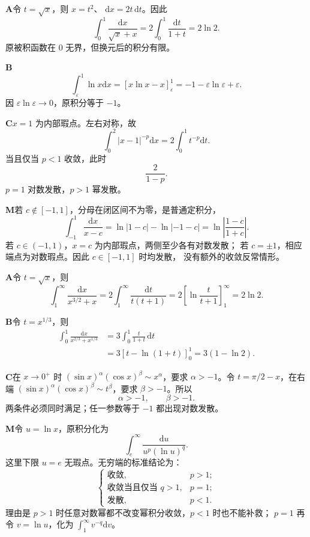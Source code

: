 \begin{solutionBox}
\textbf{A}\quad 令 \(t=\sqrt x\)，则 \(x=t^2\)、
\(\mathrm dx=2t\,\mathrm dt\)。因此
\[
\int_0^1\frac{\mathrm dx}{\sqrt x+x}
=2\int_0^1\frac{\mathrm dt}{1+t}
=2\ln2.
\]
原被积函数在 \(0\) 无界，但换元后的积分有限。
\end{solutionBox}
\begin{solutionBox}
\textbf{B}\quad
\[
\int_\varepsilon^1\ln x\mathrm dx
=[x\ln x-x]_\varepsilon^1
=-1-\varepsilon\ln\varepsilon+\varepsilon.
\]
因 \(\varepsilon\ln\varepsilon\to0\)，原积分等于 \(-1\)。
\end{solutionBox}
\begin{solutionBox}
\textbf{C}\quad \(x=1\) 为内部瑕点。左右对称，故
\[
\int_0^2|x-1|^{-p}\mathrm dx
=2\int_0^1t^{-p}\mathrm dt.
\]
当且仅当 \(p<1\) 收敛，此时
\[
\boxed{\frac2{1-p}}.
\]
\(p=1\) 对数发散，\(p>1\) 幂发散。
\end{solutionBox}
\begin{solutionBox}
\textbf{M}\quad 若 \(c\notin[-1,1]\)，分母在闭区间不为零，是普通定积分，
\[
\int_{-1}^{1}\frac{\mathrm dx}{x-c}
=\ln|1-c|-\ln|-1-c|
=\ln\left|\frac{1-c}{1+c}\right|.
\]
若 \(c\in(-1,1)\)，\(x=c\) 为内部瑕点，两侧至少各有对数发散；
若 \(c=\pm1\)，相应端点为对数瑕点。因此 \(c\in[-1,1]\) 时均发散，
没有额外的收敛反常情形。
\end{solutionBox}

\begin{solutionBox}
\textbf{A}\quad 令 \(t=\sqrt x\)，则
\[
\int_1^\infty\frac{\mathrm dx}{x^{3/2}+x}
=2\int_1^\infty\frac{\mathrm dt}{t(t+1)}
=2\left[\ln\frac{t}{t+1}\right]_1^\infty
=2\ln2.
\]
\end{solutionBox}
\begin{solutionBox}
\textbf{B}\quad 令 \(t=x^{1/3}\)，则
\[
\begin{aligned}
\int_0^1\frac{\mathrm dx}{x^{2/3}+x^{1/3}}
&=3\int_0^1\frac{t}{1+t}\,\mathrm dt\\
&=3\left[t-\ln(1+t)\right]_0^1
=3(1-\ln2).
\end{aligned}
\]
\end{solutionBox}
\begin{solutionBox}
\textbf{C}\quad 在 \(x\to0^+\) 时
\((\sin x)^\alpha(\cos x)^\beta\sim x^\alpha\)，要求
\(\alpha>-1\)。令 \(t=\pi/2-x\)，在右端
\((\sin x)^\alpha(\cos x)^\beta\sim t^\beta\)，要求
\(\beta>-1\)。所以
\[
\boxed{\alpha>-1,\qquad\beta>-1}.
\]
两条件必须同时满足；任一参数等于 \(-1\) 都出现对数发散。
\end{solutionBox}
\begin{solutionBox}
\textbf{M}\quad 令 \(u=\ln x\)，原积分化为
\[
\int_e^\infty\frac{\mathrm du}{u^p(\ln u)^q}.
\]
这里下限 \(u=e\) 无瑕点。无穷端的标准结论为：
\[
\boxed{
\begin{cases}
\text{收敛},&p>1;\\
\text{收敛当且仅当 }q>1,&p=1;\\
\text{发散},&p<1.
\end{cases}}
\]
理由是 \(p>1\) 时任意对数幂都不改变幂积分收敛，\(p<1\) 时也不能补救；
\(p=1\) 再令 \(v=\ln u\)，化为
\(\int_1^\infty v^{-q}\mathrm dv\)。
\end{solutionBox}

